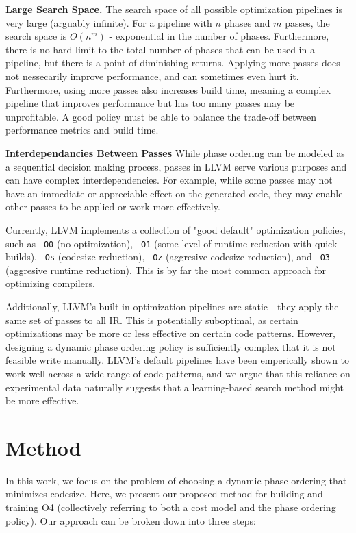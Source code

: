 \documentclass[conference]{IEEEtran}
\begin{document}
\textbf{Large Search Space.} The search space of all possible optimization
pipelines is very large (arguably infinite). For a pipeline with \(n\) phases
and \(m\) passes, the search space is \(O(n^m)\) - exponential in the number of
phases. Furthermore, there is no hard limit to the total number of phases that
can be used in a pipeline, but there is a point of diminishing returns. Applying
more passes does not nessecarily improve performance, and can sometimes even
hurt it. Furthermore, using more passes also increases build time, meaning a
complex pipeline that improves performance but has too many passes may be
unprofitable. A good policy must be able to balance the trade-off between
performance metrics and build time.

\textbf{Interdependancies Between Passes} While phase ordering can be modeled as
a sequential decision making process, passes in LLVM serve various purposes and
can have complex interdependencies. For example, while some passes may not have
an immediate or appreciable effect on the generated code, they may enable other
passes to be applied or work more effectively.

Currently, LLVM implements a collection of "good default" optimization policies,
such as \texttt{-O0} (no optimization), \texttt{-O1} (some level of runtime
reduction with quick builds), \texttt{-Os} (codesize reduction), \texttt{-Oz}
(aggresive codesize reduction), and \texttt{-O3} (aggresive runtime reduction).
This is by far the most common approach for optimizing compilers.

Additionally, LLVM's built-in optimization pipelines are static - they apply the
same set of passes to all IR. This is potentially suboptimal, as certain
optimizations may be more or less effective on certain code patterns. However,
designing a dynamic phase ordering policy is sufficiently complex that it is not
feasible write manually. LLVM's default pipelines have been emperically shown to
work well across a wide range of code patterns, and we argue that this reliance
on experimental data naturally suggests that a learning-based search method
might be more effective.

\section{Method}

In this work, we focus on the problem of choosing a dynamic phase ordering that
minimizes codesize. Here, we present our proposed method for building and
training O4 (collectively referring to both a cost model and the phase ordering
policy). Our approach can be broken down into three steps:
\end{document}
